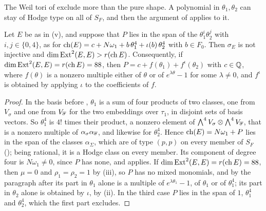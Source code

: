 The Weil tori of  exclude more than the pure shape.
A polynomial in $\theta_{1},\theta_{2}$ can stay of Hodge type on all of
$S_{F}$, and then the argument of  applies to it.

\begin{proposition}
\label{prop:quarticweiltori}
Let $E$ be as in \textup{(v)}, and suppose that $P$
lies in the span of the $\theta_{1}^{i}\theta_{2}^{j}$ with
$i,j\in\{0,4\}$, as for $\operatorname{ch}(E)=c+N\omega_{1}+b\,\theta_{1}^{4}+
\iota(b)\,\theta_{2}^{4}$ with $b\in F_{0}$. Then $\sigma_{E}$ is not
injective and $\dim\operatorname{Ext}^{2}(E,E)>r(\operatorname{ch} E)$. Consequently, if
$\dim\operatorname{Ext}^{2}(E,E)=r(\operatorname{ch} E)=88$, then $P=c+f(\theta_{1})+f^{\iota}(\theta_{2})$
with $c\in\mathbb{Q}$, where $f(\theta)$ is a nonzero multiple either of $\theta$ or
of $e^{\lambda\theta}-1$ for some $\lambda\ne0$, and $f^{\iota}$ is obtained
by applying $\iota$ to the coefficients of $f$.
\end{proposition}

\begin{proof}
In the basis before , $\theta_{1}$ is a sum of four
products of two classes, one from $V_{\sigma}$ and one from $V_{\overline{\sigma}}$
for the two embeddings over $\tau_{1}$, in disjoint sets of basis vectors.
So $\theta_{1}^{4}$ is $4!$ times their product, a nonzero element of
$\bigwedge^{4}V_{\sigma}\otimes\bigwedge^{4}V_{\overline{\sigma}}$, that is a
nonzero multiple of $\alpha_{\sigma}\alpha_{\overline{\sigma}}$, and likewise for
$\theta_{2}^{4}$. Hence $\operatorname{ch}(E)=N\omega_{1}+P$ lies in the span of the
classes $\alpha_{\Sigma}$, which are of type $(p,p)$ on every member of
$S_{F}$ (); being rational, it is a Hodge class on
every member. Its component of degree four is $N\omega_{1}\ne0$, since $P$
has none, and  applies. If $\dim\operatorname{Ext}^{2}(E,E)=
r(\operatorname{ch} E)=88$, then $\mu=0$ and $\rho_{1}=\rho_{2}=1$ by
(iii), so $P$ has no mixed monomials, and by the
paragraph after  its part in $\theta_{1}$ alone is a
multiple of $e^{\lambda\theta_{1}}-1$, of $\theta_{1}$ or of $\theta_{1}^{4}$;
its part in $\theta_{2}$ alone is obtained by $\iota$, by
(ii). In the third case $P$ lies in the span of
$1$, $\theta_{1}^{4}$ and $\theta_{2}^{4}$, which the first part excludes.
\end{proof}

